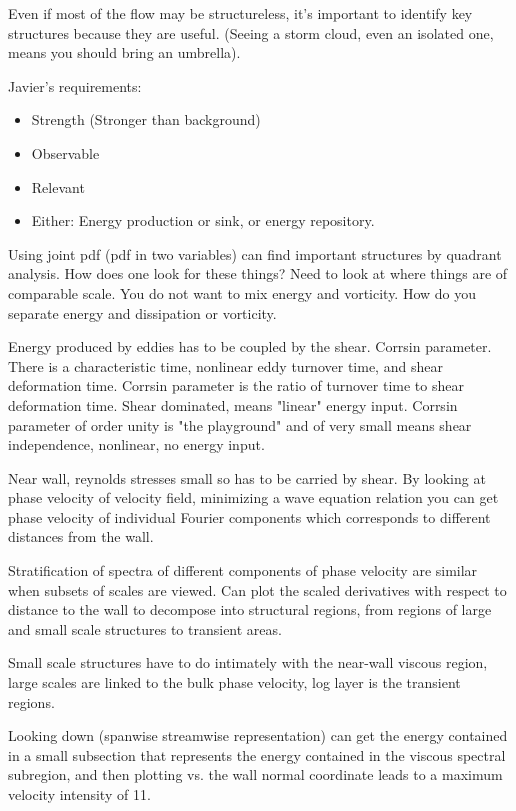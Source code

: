 \begin{description}
{\begin{description}
Even if most of the flow may be structureless, it's important to identify key structures
because they are useful. (Seeing a storm cloud, even an isolated one, means you should bring an umbrella).

Javier's requirements:
\begin{itemize}
\item Strength (Stronger than background)
\item Observable
\item Relevant
\item Either: Energy production or sink, or energy repository.
\end{itemize}

Using joint pdf (pdf in two variables) can find important structures by quadrant analysis.
How does one look for these things? Need to look at where things are of comparable scale.
You do not want to mix energy and vorticity. How do you separate energy and dissipation or vorticity.

Energy produced by eddies has to be coupled by the shear. Corrsin parameter.
There is a characteristic time, nonlinear eddy turnover time, and shear deformation time.
Corrsin parameter is the ratio of turnover time to shear deformation time. Shear dominated,
means "linear" energy input. Corrsin parameter of order unity is "the playground" and of
very small means shear independence, nonlinear, no energy input.

Near wall, reynolds stresses small so has to be carried by shear.
By looking at phase velocity of velocity field, minimizing a wave equation relation
you can get phase velocity of individual Fourier components which corresponds to different
distances from the wall.

Stratification of spectra of different components of phase velocity
are similar when subsets of scales are viewed.
Can plot the scaled derivatives with respect to distance to the wall to decompose into
structural regions, from regions of large and small scale structures to transient areas.

Small scale structures have to do intimately with the near-wall viscous region, large scales
are linked to the bulk phase velocity, log layer is the transient regions.

Looking down (spanwise streamwise representation) can get the energy contained in a small
subsection that represents the energy contained in the viscous spectral subregion, and then plotting
vs. the wall normal coordinate leads to a maximum velocity intensity of 11.


\end{description}}
\end{description}
